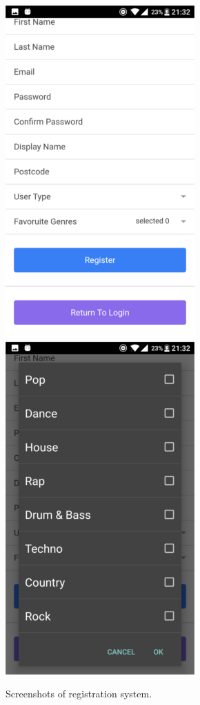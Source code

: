 \begin{center}
\begin{figure}[H]
\includegraphics[scale=0.5]{images/sc3}
\includegraphics[scale=0.5]{images/sc4}
\caption{Screenshots of registration system.}
\end{figure}
\end{center}

